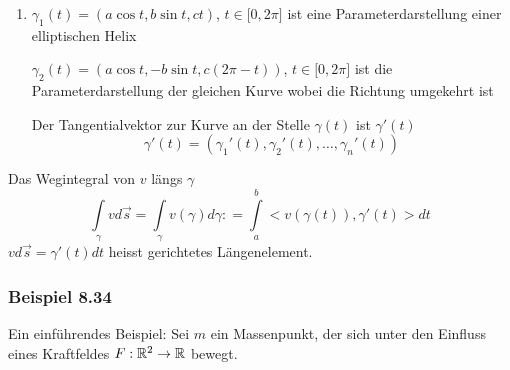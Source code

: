 \begin{enumerate}
\begin{figure}[H]
\begin{minipage}[b]{0.45\linewidth}
\end{minipage}
\end{figure}
\item $\gamma_1 (t)=\left( a\cos t,b\sin t, ct\right)$, $t\in\lbrack 0,2\pi\rbrack$ ist eine Parameterdarstellung einer elliptischen Helix
\begin{center}
\end{center}
$\gamma_2 (t)=\left( a\cos t,-b\sin t, c(2\pi -t)\right)$, $t\in\lbrack 0,2\pi\rbrack$ ist die Parameterdarstellung der gleichen Kurve wobei die Richtung umgekehrt ist

\begin{center}
\end{center}

Der Tangentialvektor zur Kurve an der Stelle $\gamma (t)$ ist $\gamma' (t)$ \[\gamma'(t)=\left( \gamma_1'(t),\gamma_2'(t),\dots, \gamma_n'(t)\right)\]
\end{enumerate}

\begin{definition}{8.33}
Das Wegintegral von $v$ längs $\gamma$
\[\int\limits_\gamma  {vd\vec s}  = \int\limits_\gamma  {v(\gamma )d\gamma : = \int\limits_a^b { < v\left( {\gamma \left( t \right)} \right),\gamma '(t) > dt} } \] ${vd\vec s}=\gamma'(t)dt$ heisst gerichtetes Längenelement.
\end{definition}

\subsubsection*{Beispiel 8.34}
Ein einführendes Beispiel: Sei $m$ ein Massenpunkt, der sich unter den Einfluss eines Kraftfeldes $F:\mathbb{R}^2\to\mathbb{R}$ bewegt.\\

